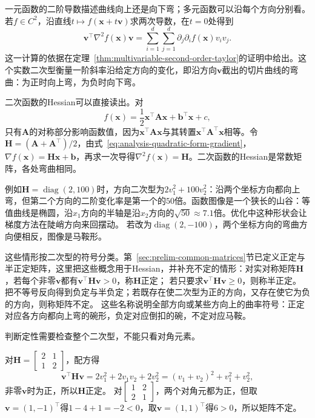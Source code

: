 一元函数的二阶导数描述曲线向上还是向下弯；多元函数可以沿每个方向分别看。若$f\in C^2$，沿直线$t\mapsto f(\bm x+t\bm v)$求两次导数，在$t=0$处得到
\[
 \bm v^\top\nabla^2f(\bm x)\bm v
 =\sum_{i=1}^d\sum_{j=1}^d \partial_j\partial_i f(\bm x)v_i v_j.
\]
这一计算的依据在定理~\ref{thm:multivariable-second-order-taylor}的证明中给出。这个实数二次型衡量一阶斜率沿给定方向的变化，即沿方向$\bm v$截出的切片曲线的弯曲：为正时向上弯，为负时向下弯。

二次函数的Hessian可以直接读出。对
\[
 f(\bm{x})=\frac12\bm{x}^{\top}\bm{A}\bm{x}+\bm{b}^{\top}\bm{x}+c,
\]
只有$\bm{A}$的对称部分影响函数值，因为$\bm x^\top\bm A\bm x$与其转置$\bm x^\top\bm A^\top\bm x$相等。令$\bm{H}=(\bm{A}+\bm{A}^{\top})/2$，由式~\eqref{eq:analysis-quadratic-form-gradient}，$\nabla f(\bm{x})=\bm{H}\bm{x}+\bm{b}$，再求一次导得$\nabla^2f(\bm{x})=\bm{H}$。二次函数的Hessian是常数矩阵，各处弯曲相同。

例如$\bm H=\operatorname{diag}(2,100)$时，方向二次型为$2v_1^2+100v_2^2$：沿两个坐标方向都向上弯，但第二个方向的二阶变化率是第一个的$50$倍。函数图像是一个狭长的山谷：等值曲线是椭圆，沿$x_1$方向的半轴是沿$x_2$方向的$\sqrt{50}\approx7.1$倍。优化中这种形状会让梯度方法在陡峭方向来回摆动。
若改为$\operatorname{diag}(2,-100)$，两个坐标方向的弯曲方向便相反，图像是马鞍形。

这些情形按二次型的符号分类。第~\ref{sec:prelim-common-matrices}节已定义正定与半正定矩阵，这里把这些概念用于Hessian，并补充不定的情形：对实对称矩阵$\bm H$，若每个非零$\bm v$都有$\bm v^\top\bm H\bm v>0$，称$\bm H$正定；
若只要求$\bm v^\top\bm H\bm v\geq0$，则称半正定。
把不等号反向得到负定与半负定；若既存在使二次型为正的方向，又存在使它为负的方向，则称矩阵不定。
这些名称说明全部方向或某些方向上的曲率符号：正定对应各方向都向上弯的碗形，负定对应倒扣的碗，不定对应马鞍。

判断定性需要检查整个二次型，不能只看对角元素。
\begin{example}[用二次型判断Hessian的定性]
\label{ex:multivariable-hessian-definiteness}
对$\bm H=\begin{bmatrix}2&1\\1&2\end{bmatrix}$，配方得
\[
 \bm v^\top\bm H\bm v=2v_1^2+2v_1v_2+2v_2^2=(v_1+v_2)^2+v_1^2+v_2^2,
\]
非零$\bm v$时为正，所以$\bm H$正定。
对$\begin{bmatrix}1&2\\2&1\end{bmatrix}$，两个对角元都为正，但取$\bm v=(1,-1)^\top$得$1-4+1=-2<0$，取$\bm v=(1,1)^\top$得$6>0$，所以矩阵不定。
\end{example}

